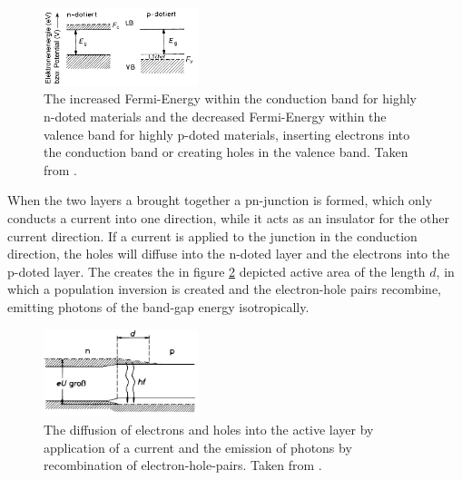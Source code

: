             \begin{figure}[h]
                \centering
                \includegraphics[width = 0.4\textwidth]{pictures/pn_doted.png}
                \caption{The increased Fermi-Energy within the conduction band for highly n-doted materials and the decreased Fermi-Energy within the valence band for highly p-doted materials, inserting electrons into the conduction band or creating holes in the valence band. Taken from \cite{eichler_laser_2015}.}
                \label{fig:pn_doted}
             \end{figure}
         
             \FloatBarrier
         
            When the two layers a brought together a pn-junction is formed, which only conducts a current into one direction, while it acts as an insulator for the other current direction. If a current is applied
            to the junction in the conduction direction, the holes will diffuse into the n-doted layer and the electrons into the p-doted layer. The creates the in figure \ref{fig:eh_diffusion} depicted active 
            area of the length $d$, in which a population inversion is created and the electron-hole pairs recombine, emitting photons of the band-gap energy isotropically.   
         
            \begin{figure}[h]
                \centering
                \includegraphics[width = 0.4\textwidth]{pictures/eh_diffusion.jpg}
                \caption{The diffusion of electrons and holes into the active layer by application of a current and the emission of photons by recombination of electron-hole-pairs. Taken from \cite{eichler_laser_2015}.}
                \label{fig:eh_diffusion}
            \end{figure}
        
            \FloatBarrier

